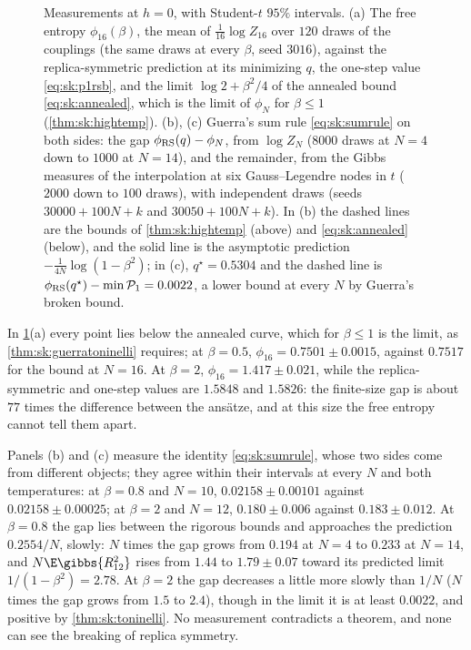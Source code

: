 \begin{refsection}
\begin{figure}[t]
\begin{fullwidth}
\vspace{1mm}
\end{fullwidth}
\caption{Measurements at $h=0$, with Student-$t$ $95\%$ intervals. (a) The free entropy $\phi_{16}(\beta)$, the mean of $\frac1{16}\log Z_{16}$ over $120$ draws of the couplings (the same draws at every $\beta$, seed $3016$), against the replica-symmetric prediction at its minimizing $q$, the one-step value \eqref{eq:sk:p1rsb}, and the limit $\log2+\beta^2/4$ of the annealed bound \eqref{eq:sk:annealed}, which is the limit of $\phi_N$ for $\beta\le1$ (\cref{thm:sk:hightemp}). (b), (c) Guerra's sum rule \eqref{eq:sk:sumrule} on both sides: the gap $\phi_{\mathrm{RS}}(q)-\phi_N$, from $\log Z_N$ ($8000$ draws at $N=4$ down to $1000$ at $N=14$), and the remainder, from the Gibbs measures of the interpolation at six Gauss--Legendre nodes in $t$ ($2000$ down to $100$ draws), with independent draws (seeds $30000+100N+k$ and $30050+100N+k$). In (b) the dashed lines are the bounds of \cref{thm:sk:hightemp} (above) and \eqref{eq:sk:annealed} (below), and the solid line is the asymptotic prediction $-\frac1{4N}\log(1-\beta^2)$; in (c), $q^\star=0.5304$ and the dashed line is $\phi_{\mathrm{RS}}(q^\star)-\min\mathcal{P}_1=0.0022$, a lower bound at every $N$ by Guerra's broken bound.}\label{fig:sk:measure}
\end{figure}

In \cref{fig:sk:measure}(a) every point lies below the annealed curve, which for $\beta\le1$ is the limit, as \cref{thm:sk:guerratoninelli} requires; at $\beta=0.5$, $\phi_{16}=0.7501\pm0.0015$, against $0.7517$ for the bound at $N=16$. At $\beta=2$, $\phi_{16}=1.417\pm0.021$, while the replica-symmetric and one-step values are $1.5848$ and $1.5826$: the finite-size gap is about $77$ times the difference between the ans\"atze, and at this size the free entropy cannot tell them apart.

Panels (b) and (c) measure the identity \eqref{eq:sk:sumrule}, whose two sides come from different objects; they agree within their intervals at every $N$ and both temperatures: at $\beta=0.8$ and $N=10$, $0.02158\pm0.00101$ against $0.02158\pm0.00025$; at $\beta=2$ and $N=12$, $0.180\pm0.006$ against $0.183\pm0.012$. At $\beta=0.8$ the gap lies between the rigorous bounds and approaches the prediction $0.2554/N$, slowly: $N$ times the gap grows from $0.194$ at $N=4$ to $0.233$ at $N=14$, and $N\E\gibbs{R_{12}^2}$ rises from $1.44$ to $1.79\pm0.07$ toward its predicted limit $1/(1-\beta^2)=2.78$. At $\beta=2$ the gap decreases a little more slowly than $1/N$ ($N$ times the gap grows from $1.5$ to $2.4$), though in the limit it is at least $0.0022$, and positive by \cref{thm:sk:toninelli}. No measurement contradicts a theorem, and none can see the breaking of replica symmetry.


\end{refsection}
